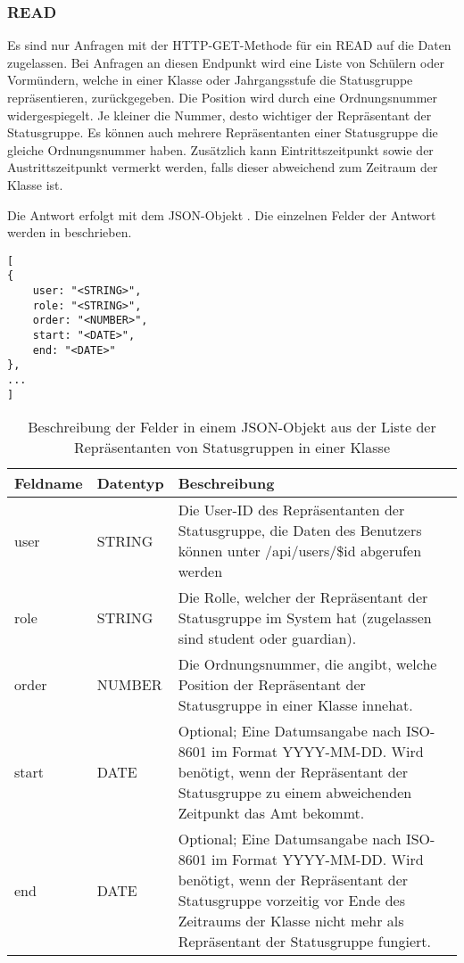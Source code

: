 \subsubsection{READ}
\label{sec:rest:api:classes:id:representatives:read}
Es sind nur Anfragen mit der HTTP-GET-Methode für ein READ auf die Daten zugelassen.
Bei Anfragen an diesen Endpunkt wird eine Liste von Schülern oder Vormündern, welche in einer Klasse oder Jahrgangsstufe die Statusgruppe repräsentieren, zurückgegeben.
Die Position wird durch eine Ordnungsnummer widergespiegelt. Je kleiner die Nummer, desto wichtiger der Repräsentant der Statusgruppe.
Es können auch mehrere Repräsentanten einer Statusgruppe die gleiche Ordnungsnummer haben.
Zusätzlich kann Eintrittszeitpunkt sowie der Austrittszeitpunkt vermerkt werden, falls dieser abweichend zum Zeitraum der Klasse ist.

Die Antwort erfolgt mit dem JSON-Objekt . 
Die einzelnen Felder der Antwort werden in  beschrieben.

\begin{lstlisting}[caption={JSON-Antwort für einen GET-Aufruf des Pfads /api/classes/\$id/representatives},label={lst:code:rest:api:classes:id:representatives:read:ret},frame=tlrb]
[ 
{ 
	user: "<STRING>",
	role: "<STRING>",
	order: "<NUMBER>",
  	start: "<DATE>",
  	end: "<DATE>"
},
... 
]
\end{lstlisting}

\begin{longtable}{|p{}|p{}|p{}|}
		\caption{Beschreibung der Felder in einem JSON-Objekt aus der Liste der Repräsentanten von Statusgruppen in einer Klasse}
\endfoot
		\caption{Beschreibung der Felder in einem JSON-Objekt aus der Liste der Repräsentanten von Statusgruppen in einer Klasse}
		\label{tab:rest:api:classes:id:representatives:read:ret}
\endlastfoot 
\hline
			\textbf{Feldname} & \textbf{Datentyp} & \textbf{Beschreibung} \\ \hline
\endhead
user & STRING & Die User-ID des Repräsentanten der Statusgruppe, die Daten des Benutzers können unter /api/users/\$id abgerufen werden \\ \hline
role & STRING & Die Rolle, welcher der Repräsentant der Statusgruppe im System hat (zugelassen sind student oder guardian). \\ \hline
order & NUMBER & Die Ordnungsnummer, die angibt, welche Position der Repräsentant der Statusgruppe in einer Klasse innehat. \\ \hline
start & DATE & Optional; Eine Datumsangabe nach ISO-8601 im Format YYYY-MM-DD. Wird benötigt, wenn der Repräsentant der Statusgruppe zu einem abweichenden Zeitpunkt das Amt bekommt. \\ \hline
end & DATE & Optional; Eine Datumsangabe nach ISO-8601 im Format YYYY-MM-DD. Wird benötigt, wenn der Repräsentant der Statusgruppe vorzeitig vor Ende des Zeitraums der Klasse nicht mehr als Repräsentant der Statusgruppe fungiert. \\ \hline
\end{longtable}
